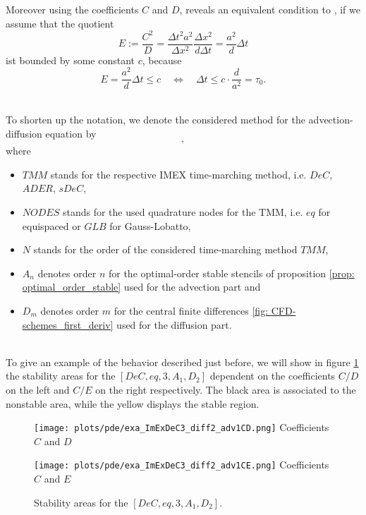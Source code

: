 Moreover using the coefficients $C$ and $D$, reveals an equivalent condition to \cite{TanChenShu_ImEx_Stability}, if we assume that the quotient
\begin{equation*}
E:=\frac{C^2}{D}= \frac{ \Delta t ^2 a^2 }{\Delta x^2} \frac{\Delta x^2}{d \Delta t} = \frac{a^2}{d}\Delta t
\end{equation*}
ist bounded by some constant $c$, because
\begin{equation*}
E= \frac{a^2}{d}\Delta t\le c \quad \Longleftrightarrow \quad \Delta t \le c \cdot \frac{d}{a^2}=\tau_0.
\end{equation*}
\begin{definition}\mbox{}\\
	To shorten up the notation, we denote the considered method for the advection-diffusion equation by
	\begin{equation*}
	[TMM,NODES,N, A_n,D_n],
	\end{equation*}
	where
	\begin{itemize}
		\item $TMM$ stands for the respective IMEX time-marching method, i.e. $DeC$, $ADER$, $sDeC$,
		\item $NODES$ stands for the used quadrature nodes for the TMM, i.e. $eq$ for equispaced or $GLB$ for Gauss-Lobatto,
		\item $N$ stands for the order of the considered time-marching method $TMM$,
		\item $A_n$ denotes order $n$ for the optimal-order stable stencils of proposition \ref{prop: optimal_order_stable} used for the advection part and
		\item $D_m$ denotes order $m$ for the central finite differences \ref{fig: CFD-schemes_first_deriv} used for the diffusion part.
	\end{itemize}
\end{definition}
\begin{example}\mbox{}\\
	To give an example of the behavior described just before, we will show in figure \ref{fig: exa_ImExDeC3_diff2_adv1} the stability areas for the $[DeC,eq,3, A_1,D_2]$ dependent on the coefficients $C/D$ on the left and $C/E$ on the right respectively. The black area is associated to the nonstable area, while the yellow displays the stable region.
	\begin{figure}[!h]
		\centering
		\begin{minipage}[t]{0.45\textwidth}
			\texttt{[image: plots/pde/exa\_ImExDeC3\_diff2\_adv1CD.png]}
			\centering
			Coefficients $C$ and $D$
		\end{minipage} 
		\begin{minipage}[t]{0.45\textwidth}
			\texttt{[image: plots/pde/exa\_ImExDeC3\_diff2\_adv1CE.png]}
			\centering
			Coefficients $C$ and $E$
		\end{minipage}
		\caption{Stability areas for the $[DeC,eq,3, A_1,D_2]$.}
		\label{fig: exa_ImExDeC3_diff2_adv1}
	\end{figure}
\end{example}

